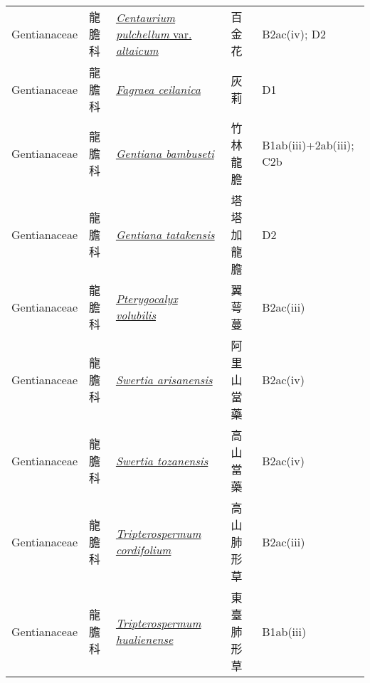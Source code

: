 {\begin{longtable}{L{2.5cm}L{2cm}L{5cm}L{2.5cm}L{3cm}}
    Gentianaceae & 龍膽科 & \href{http://www.theplantlist.org/tpl1.1/search?q=Centaurium+pulchellum+var.+altaicum}{\textit{Centaurium pulchellum} var. \textit{altaicum} } & 百金花 & B2ac(iv); D2    \\
    Gentianaceae & 龍膽科 & \href{http://www.theplantlist.org/tpl1.1/search?q=Fagraea+ceilanica}{\textit{Fagraea ceilanica} } & 灰莉 & D1    \\
    Gentianaceae & 龍膽科 & \href{http://www.theplantlist.org/tpl1.1/search?q=Gentiana+bambuseti}{\textit{Gentiana bambuseti} } & 竹林龍膽 & B1ab(iii)+2ab(iii); C2b    \\
    Gentianaceae & 龍膽科 & \href{http://www.theplantlist.org/tpl1.1/search?q=Gentiana+tatakensis}{\textit{Gentiana tatakensis} } & 塔塔加龍膽 & D2    \\
    Gentianaceae & 龍膽科 & \href{http://www.theplantlist.org/tpl1.1/search?q=Pterygocalyx+volubilis}{\textit{Pterygocalyx volubilis} } & 翼萼蔓 & B2ac(iii)    \\
    Gentianaceae & 龍膽科 & \href{http://www.theplantlist.org/tpl1.1/search?q=Swertia+arisanensis}{\textit{Swertia arisanensis} } & 阿里山當藥 & B2ac(iv)    \\
    Gentianaceae & 龍膽科 & \href{http://www.theplantlist.org/tpl1.1/search?q=Swertia+tozanensis}{\textit{Swertia tozanensis} } & 高山當藥 & B2ac(iv)    \\
    Gentianaceae & 龍膽科 & \href{http://www.theplantlist.org/tpl1.1/search?q=Tripterospermum+cordifolium}{\textit{Tripterospermum cordifolium} } & 高山肺形草 & B2ac(iii)    \\
    Gentianaceae & 龍膽科 & \href{http://www.theplantlist.org/tpl1.1/search?q=Tripterospermum+hualienense}{\textit{Tripterospermum hualienense} } & 東臺肺形草 & B1ab(iii)    \\

\end{longtable}}
